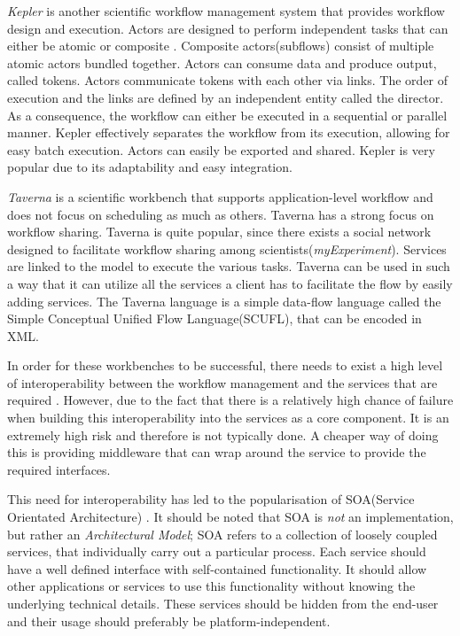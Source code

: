 \emph{Kepler} is another scientific workflow management system that
provides workflow design and execution.  Actors are designed to perform
independent tasks that can either be atomic or  composite
\cite{Wang:2009:KHG:1645164.1645176}.  Composite actors(subflows) consist of
multiple   atomic actors bundled together. Actors can consume data and produce
output, called tokens. Actors communicate tokens with each other via links. The
order of execution and the links are defined by an independent entity called
the director. As a consequence, the workflow can either be executed in a
sequential or parallel manner. Kepler effectively separates the workflow from
its execution, allowing for easy batch execution. Actors can easily be exported
and shared.  Kepler is very popular due to its adaptability and easy
integration.

    \emph{Taverna} is a scientific workbench that supports application-level
workflow and does not focus on scheduling as much as others\cite{4721191}. Taverna
has a strong focus on workflow sharing. Taverna is quite popular, since there
exists a social network designed to facilitate workflow sharing among
scientists(\emph{myExperiment}). Services are linked to the model to execute
the various tasks. Taverna can be used in such a way that it can utilize all
the services a client has to facilitate the flow by easily adding services. The
Taverna language is a simple data-flow language called the Simple Conceptual
Unified Flow Language(SCUFL), that can be encoded in XML.

In order for these workbenches to be successful, there needs to exist a
high level of interoperability between the workflow management and the services
that are required \cite{Shegalov:2001:XWM:767132.767139}.  However, due to the
fact that there is a relatively high chance of failure when building this
interoperability into the services as a core component. It is an extremely high
risk and therefore is not typically done. A cheaper way of doing this is
providing middleware that can wrap around the service to provide the required
interfaces.

This need for interoperability has led to the popularisation of SOA(Service
Orientated Architecture) \cite{Sanders:2008:SSA:1400549.1400595}.  It should be
noted that SOA is \emph{not} an implementation, but rather an
\emph{Architectural Model}; SOA refers to a collection of loosely coupled
services, that individually carry out a particular process. Each service should
have a well defined interface with self-contained functionality. It should
allow other applications or services to use this functionality without knowing
the underlying technical details. These services should be hidden from the
end-user and their usage should preferably be platform-independent.

